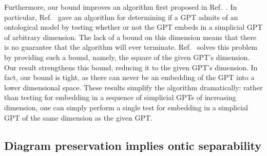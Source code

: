 \documentclass[onecolum,aps,groupedaddress,nofootinbib]{revtex4-2}
\begin{document}
Furthermore, our bound improves an algorithm first proposed in Ref.~\cite{schmid2019characterization}.
In particular,  Ref.~\cite{schmid2019characterization} gave an algorithm for determining if a GPT admits of an ontological model by testing whether or not the GPT embeds in a simplicial GPT of arbitrary dimension.
The lack of a bound on this dimension means that there is no guarantee that the algorithm will ever terminate.
Ref.~\cite{gitton2020solvable} solves this problem by providing such a bound, namely, the square of the given GPT's dimension. Our result strengthens this bound, reducing it to the given GPT's dimension. In fact, our bound is tight, as there can never be an embedding of the GPT into a lower dimensional space.
These results simplify the algorithm dramatically: rather than testing for embedding in a sequence of simplicial GPTs of increasing dimension, one can simply perform a single test for embedding in a simplicial GPT of the same dimension as the given GPT.



\subsection{Diagram preservation implies ontic separability}\label{onticseparability}
\end{document}

